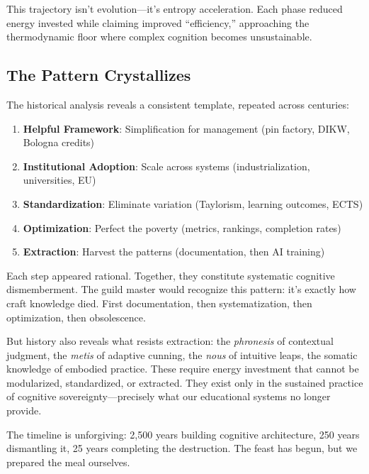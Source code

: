 This trajectory isn't evolution---it's entropy acceleration. Each phase reduced energy invested while claiming improved ``efficiency,'' approaching the thermodynamic floor where complex cognition becomes unsustainable.

\subsection{The Pattern Crystallizes}

The historical analysis reveals a consistent template, repeated across centuries:

\begin{enumerate}
    \item \textbf{Helpful Framework}: Simplification for management (pin factory, DIKW, Bologna credits)
    \item \textbf{Institutional Adoption}: Scale across systems (industrialization, universities, EU)
    \item \textbf{Standardization}: Eliminate variation (Taylorism, learning outcomes, ECTS)
    \item \textbf{Optimization}: Perfect the poverty (metrics, rankings, completion rates)
    \item \textbf{Extraction}: Harvest the patterns (documentation, then AI training)
\end{enumerate}

Each step appeared rational. Together, they constitute systematic cognitive dismemberment. The guild master would recognize this pattern: it's exactly how craft knowledge died. First documentation, then systematization, then optimization, then obsolescence.

But history also reveals what resists extraction: the \textit{phronesis} of contextual judgment, the \textit{metis} of adaptive cunning, the \textit{nous} of intuitive leaps, the somatic knowledge of embodied practice. These require energy investment that cannot be modularized, standardized, or extracted. They exist only in the sustained practice of cognitive sovereignty---precisely what our educational systems no longer provide.

The timeline is unforgiving: 2,500 years building cognitive architecture, 250 years dismantling it, 25 years completing the destruction. The feast has begun, but we prepared the meal ourselves.

%
%
%
%
